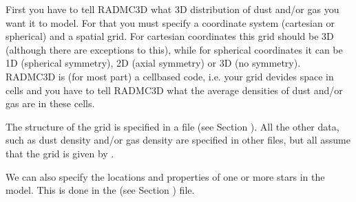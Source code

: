 \documentclass[letterpaper,10pt,english]{sphinxmanual}
\begin{document}
First you have to tell RADMC\sphinxhyphen{}3D what 3\sphinxhyphen{}D distribution of dust and/or gas you
want it to model. For that you must specify a coordinate system (cartesian or
spherical) and a spatial grid. For cartesian coordinates this grid should be 3\sphinxhyphen{}D
(although there are exceptions to this), while for spherical coordinates it can
be 1\sphinxhyphen{}D (spherical symmetry), 2\sphinxhyphen{}D (axial symmetry) or 3\sphinxhyphen{}D (no symmetry). RADMC\sphinxhyphen{}3D
is (for most part) a cell\sphinxhyphen{}based code, i.e. your grid devides space in cells and
you have to tell RADMC\sphinxhyphen{}3D what the average densities of dust and/or gas are in
these cells.

The structure of the grid is specified in a file  (see Section
{\hyperref[\detokenize{inputoutputfiles:sec-grid-input}]{}}). All the other data, such as dust density and/or gas
density are specified in other files, but all assume that the grid is given by
.

We can also specify the locations and properties of one or more stars in the
model. This is done in the  (see Section {\hyperref[\detokenize{inputoutputfiles:sec-stars}]{}}) file.
\end{document}
